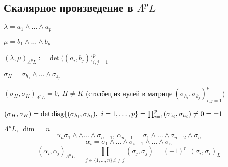     \subsection*{Скалярное произведение в $\Lambda^p L$}

    \par $\lambda = a_1 \wedge \dots \wedge a_p$
    \par $\mu = b_1 \wedge \dots \wedge b_p$
    \par $(\lambda, \mu)_{\Lambda^p L} := \det \bigg((a_i, b_j)\bigg)_{i, j = 1}^p$
    \par $\sigma_H = \sigma_{h_1} \wedge \dots \wedge \sigma_{h_p}$
    \par $(\sigma_H, \sigma_K)_{\Lambda^p L} = 0, \ H \not= K$ (столбец из нулей в матрице $(\sigma_{h_i}, \sigma_{k_j})_{i, j = 1}^p$)

    $(\sigma_H, \sigma_H) = \det \operatorname{diag} \{(\sigma_{h_i}, \sigma_{h_i}), \ i = 1, \dots, p\} = \prod_{i=1}^p (\sigma_{h_i}, \sigma_{h_i}) \not= 0 = \pm 1$

    \par $\Lambda^p L, \ \dim = n$
    \[
        \alpha_n \sigma_1 \wedge \wedge \dots \wedge \sigma_{n-1}, \ \alpha_{n-1} = \sigma_1 \wedge \dots \wedge \sigma_{n-2} \wedge \sigma_n    
    \]
    \[
        \alpha_i = \sigma_1 \wedge \dots \wedge \sigma_{i+1} \wedge \dots \wedge \sigma_n    
    \]
    \[
        (\alpha_i, \alpha_j)_{\Lambda^n L} = \prod_{j \in \{1, \dots, n\}, i \not= j} (\sigma_j, \sigma_j) = (-1)^{r_-} (\sigma_i, \sigma_i)_L  
    \]
